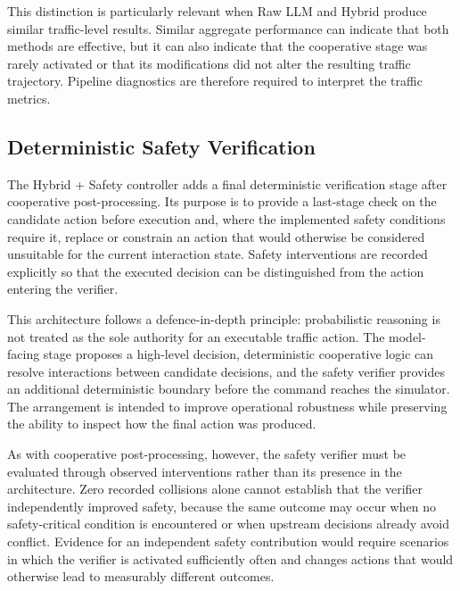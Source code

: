 \documentclass[letterpaper,10pt,conference]{ieeeconf}
\begin{document}
This distinction is particularly relevant when Raw LLM and Hybrid produce similar traffic-level results. Similar aggregate performance can indicate that both methods are effective, but it can also indicate that the cooperative stage was rarely activated or that its modifications did not alter the resulting traffic trajectory. Pipeline diagnostics are therefore required to interpret the traffic metrics.



\subsection{Deterministic Safety Verification}



The Hybrid + Safety controller adds a final deterministic verification stage after cooperative post-processing. Its purpose is to provide a last-stage check on the candidate action before execution and, where the implemented safety conditions require it, replace or constrain an action that would otherwise be considered unsuitable for the current interaction state. Safety interventions are recorded explicitly so that the executed decision can be distinguished from the action entering the verifier.



This architecture follows a defence-in-depth principle: probabilistic reasoning is not treated as the sole authority for an executable traffic action. The model-facing stage proposes a high-level decision, deterministic cooperative logic can resolve interactions between candidate decisions, and the safety verifier provides an additional deterministic boundary before the command reaches the simulator. The arrangement is intended to improve operational robustness while preserving the ability to inspect how the final action was produced.



As with cooperative post-processing, however, the safety verifier must be evaluated through observed interventions rather than its presence in the architecture. Zero recorded collisions alone cannot establish that the verifier independently improved safety, because the same outcome may occur when no safety-critical condition is encountered or when upstream decisions already avoid conflict. Evidence for an independent safety contribution would require scenarios in which the verifier is activated sufficiently often and changes actions that would otherwise lead to measurably different outcomes.
\end{document}
